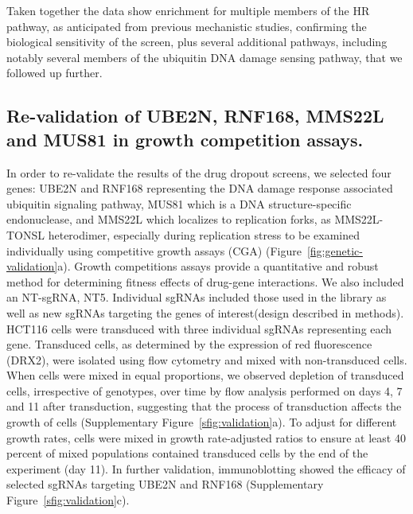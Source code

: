 Taken together the data show enrichment for multiple members of the HR pathway, as anticipated from previous mechanistic studies, confirming the biological sensitivity of the screen, plus several additional pathways, including notably several members of the ubiquitin DNA damage sensing pathway, that we followed up further.

\subsection{Re-validation of UBE2N, RNF168, MMS22L and MUS81 in growth competition assays.}
In order to re-validate the results of the drug dropout screens, we selected four genes: UBE2N and RNF168 representing the DNA damage response associated ubiquitin signaling pathway, MUS81 which is a DNA structure-specific endonuclease, and MMS22L which localizes to replication forks, as MMS22L-TONSL heterodimer, especially during replication stress\cite{Piwko2016} to be examined individually using competitive growth assays (CGA) (Figure~\ref{fig:genetic-validation}a).
Growth competitions assays provide a quantitative and robust method for determining fitness effects of drug-gene interactions.
We also included an NT-sgRNA, NT5. Individual sgRNAs included those used in the library as well as new sgRNAs targeting the genes of interest(design described in methods). 
HCT116 cells were transduced with three individual sgRNAs representing each gene. 
Transduced cells, as determined by the expression of red fluorescence (DRX2), were isolated using flow cytometry and mixed with non-transduced cells. 
When cells were mixed in equal proportions, we observed depletion of transduced cells, irrespective of genotypes, over time by flow analysis performed on days 4, 7 and 11 after transduction, suggesting that the process of transduction affects the growth of cells (Supplementary Figure~\ref{sfig:validation}a). 
To adjust for different growth rates, cells were mixed in growth rate-adjusted ratios to ensure at least 40 percent of mixed populations contained transduced cells by the end of the experiment (day 11). 
In further validation, immunoblotting showed the efficacy of selected sgRNAs targeting UBE2N and RNF168 (Supplementary Figure~\ref{sfig:validation}c).

